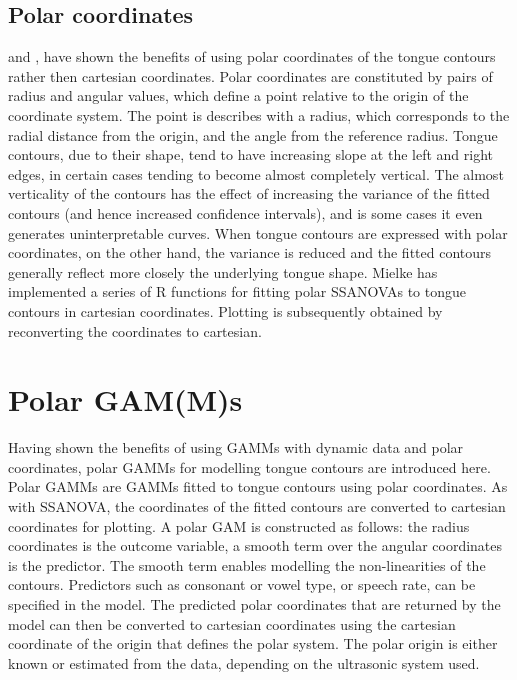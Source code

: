 \documentclass[12pt,]{article}
\begin{document}
\hypertarget{polar-coordinates}{%
\subsection{Polar coordinates}\label{polar-coordinates}}

\citet{mielke2015} and \citet{heyne2015a}, \citet{heyne2015} have shown
the benefits of using polar coordinates of the tongue contours rather
then cartesian coordinates. Polar coordinates are constituted by pairs
of radius and angular values, which define a point relative to the
origin of the coordinate system. The point is describes with a radius,
which corresponds to the radial distance from the origin, and the angle
from the reference radius. Tongue contours, due to their shape, tend to
have increasing slope at the left and right edges, in certain cases
tending to become almost completely vertical. The almost verticality of
the contours has the effect of increasing the variance of the fitted
contours (and hence increased confidence intervals), and is some cases
it even generates uninterpretable curves. When tongue contours are
expressed with polar coordinates, on the other hand, the variance is
reduced and the fitted contours generally reflect more closely the
underlying tongue shape. Mielke has implemented a series of R
\citep{r-core-team2018} functions for fitting polar SSANOVAs to tongue
contours in cartesian coordinates. Plotting is subsequently obtained by
reconverting the coordinates to cartesian.

\hypertarget{polar-gamms}{%
\section{Polar GAM(M)s}\label{polar-gamms}}

Having shown the benefits of using GAMMs with dynamic data and polar
coordinates, polar GAMMs for modelling tongue contours are introduced
here. Polar GAMMs are GAMMs fitted to tongue contours using polar
coordinates. As with SSANOVA, the coordinates of the fitted contours are
converted to cartesian coordinates for plotting. A polar GAM is
constructed as follows: the radius coordinates is the outcome variable,
a smooth term over the angular coordinates is the predictor. The smooth
term enables modelling the non-linearities of the contours. Predictors
such as consonant or vowel type, or speech rate, can be specified in the
model. The predicted polar coordinates that are returned by the model
can then be converted to cartesian coordinates using the cartesian
coordinate of the origin that defines the polar system. The polar origin
is either known or estimated from the data, depending on the ultrasonic
system used.
\end{document}
